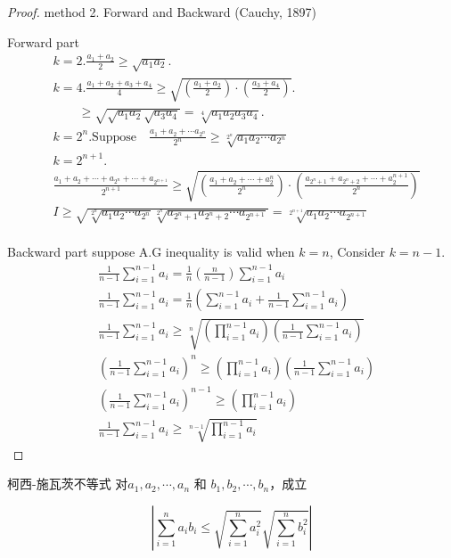 \begin{proof}
method 2. Forward and Backward (Cauchy, 1897)

Forward part
\begin{align*}
	&k = 2. \frac{a_1+a_2}{2}\ge \sqrt{a_1a_2}.\\
	&k = 4. \frac{a_1+a_2+a_3+a_4}{4} \ge\sqrt{(\frac{a_1+a_2}{2})\cdot(\frac{a_3+a_4}{2})}.\\
	&\qquad  \ge \sqrt{\sqrt{a_1a_2}\sqrt{a_3a_4}} = \sqrt[4]{a_1a_2a_3a_4}.\\
	&k = 2^n. \text{Suppose}\quad \frac{a_1+a_2+\cdots a_{2^n}}{2^n} \ge \sqrt[2^n]{a_1a_2\cdots a_{2^n}}\\
	&k = 2^{n+1}.\\
	&	\frac{a_1+a_2+\cdots+a_{2^n}+\cdots+a_{2^{n+1}}}{2^{n+1}} \ge \sqrt{(\frac{a_1+a_2+\cdots+a_2^{n}}{2^n})\cdot(\frac{a_{2^{n} + 1}+a_{2^{n}+2}+\cdots+a_2^{n+1}}{2^n})}\\
	&I\ge \sqrt{\sqrt[2^n]{a_1a_2\cdots a_{2^n}}\sqrt[2^n]{a_{2^n+1} a_{2^n+2}\cdots a_{2^{n+1}}}} = \sqrt[2^{n+1}]{a_1a_2\cdots a_{2^{n+1}}}\\
\end{align*}

Backward part
suppose A.G inequality is valid when $ k = n $, Consider $ k = n-1 $.
\begin{align*}
	&\frac{1}{n-1}\sum_{i=1}^{n-1} a_i = \frac{1}{n}(\frac{n}{n-1})\sum_{i=1}^{n-1}a_i\\
	&\frac{1}{n-1}\sum_{i=1}^{n-1} a_i = \frac{1}{n}(\sum_{i=1}^{n-1} a_i + \frac{1}{n-1} \sum_{i=1}^{n-1} a_i)\\
	&\frac{1}{n-1} \sum_{i=1}^{n-1} a_i \ge \sqrt[n]{(\prod_{i=1}^{n-1} a_i)(\frac{1}{n-1}\sum_{i=1}^{n-1} a_i)}\\
	&(\frac{1}{n-1} \sum_{i=1}^{n-1} a_i)^n \ge (\prod_{i=1}^{n-1} a_i)(\frac{1}{n-1}\sum_{i=1}^{n-1} a_i)\\
	&(\frac{1}{n-1} \sum_{i=1}^{n-1} a_i)^{n-1} \ge (\prod_{i=1}^{n-1} a_i)\\
	&\frac{1}{n-1} \sum_{i=1}^{n-1} a_i \ge \sqrt[n-1]{\prod_{i=1}^{n-1} a_i}
\end{align*}
\end{proof}

\begin{proposition}
	 柯西-施瓦茨不等式
	对$ a_1,a_2,\cdots,a_n $ 和 $ b_1,b_2,\cdots,b_n $，成立
\end{proposition}


\begin{equation*}
	|\sum_{i=1}^n a_i b_i \le \sqrt{\sum_{i=1}^n a_i^2}\sqrt{\sum_{i=1}^n b_i^2}|
\end{equation*}

